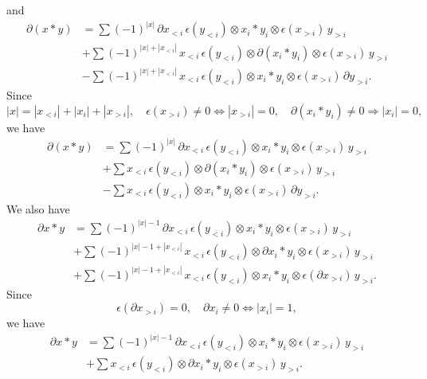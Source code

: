 and
\begin{align*}
\partial(x \ast y) & =
\sum (-1)^{|x|} \, \partial x_{<i}\, \epsilon(y_{<i}) \otimes x_i \ast y_i \otimes \epsilon(x_{>i})\, y_{>i} \\ & +
\sum (-1)^{|x|+|x_{<i}|} \, x_{<i}\, \epsilon(y_{<i}) \otimes \partial (x_i \ast y_i) \otimes \epsilon(x_{>i}) \, y_{>i} \\ & -
\sum (-1)^{|x|+|x_{<i}|} \, x_{<i}\, \epsilon(y_{<i}) \otimes x_i \ast y_i \otimes \epsilon(x_{>i})\, \partial y_{>i}.
\end{align*}
Since
\[
|x| = |x_{<i}| + |x_i| + |x_{>i}|, \quad \epsilon(x_{>i}) \neq 0 \Leftrightarrow |x_{>i}| = 0, \quad \partial(x_i \ast y_i) \neq 0 \Rightarrow |x_i| = 0,
\]
we have
\begin{equation} \label{e:boundary of product 1}
\begin{split}
\partial(x \ast y) & =
\sum (-1)^{|x|} \, \partial x_{<i}\, \epsilon(y_{<i}) \otimes x_i \ast y_i \otimes \epsilon(x_{>i})\, y_{>i} \\ & +
\sum x_{<i} \, \epsilon(y_{<i}) \otimes \partial (x_i \ast y_i) \otimes \epsilon(x_{>i})\, y_{>i} \\ & -
\sum x_{<i} \, \epsilon(y_{<i}) \otimes x_i \ast y_i \otimes \epsilon(x_{>i})\, \partial y_{>i}.
\end{split}
\end{equation}
We also have
\begin{align*}
\partial x \ast y & =
\sum (-1)^{|x|-1} \, \partial x_{<i}\, \epsilon(y_{<i}) \otimes x_i \ast y_i \otimes \epsilon(x_{>i}) \, y_{>i} \\ & +
\sum (-1)^{|x|-1+|x_{<i}|} \, x_{<i}\, \epsilon(y_{<i}) \otimes \partial x_i \ast y_i \otimes \epsilon(x_{>i}) \, y_{>i} \\ & +
\sum (-1)^{|x|-1+|x_{<i}|} \, x_{<i}\, \epsilon(y_{<i}) \otimes x_i \ast y_i \otimes \epsilon(\partial x_{>i}) \, y_{>i}.
\end{align*}
Since
\[
\epsilon(\partial x_{>i}) = 0, \quad \partial x_i \neq 0 \Leftrightarrow |x_i| = 1,
\]
we have
\begin{equation} \label{e:boundary of product 2}
\begin{split}
\partial x \ast y & =
\sum (-1)^{|x|-1} \, \partial x_{<i}\, \epsilon(y_{<i}) \otimes x_i \ast y_i \otimes \epsilon(x_{>i})\, y_{>i} \\ & +
\sum x_{<i}\, \epsilon(y_{<i}) \otimes \partial x_i \ast y_i \otimes \epsilon(x_{>i})\, y_{>i}.
\end{split}
\end{equation}
